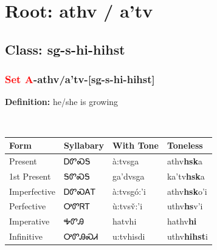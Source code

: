 \needspace{4in}
\section*{Root: athv / a'tv}
\nopagebreak
{}
\needspace{3in}
\subsection*{Class: sg-s-hi-hihst}
\nopagebreak
\needspace{2in}
\subsubsection*{\textcolor{Red}{Set A}{-}\textbf{athv/a'tv}{-}[sg-s-hi-hihst]}
\nopagebreak
\textbf{Definition: } he/she is growing
\\[0.5em]
\begin{tabularx}{\textwidth}{l X X X}%
\toprule%
\textbf{Form}&\textbf{Syllabary}&\textbf{With Tone}&\textbf{Toneless}\\%
\midrule%
Present&ᎠᏛᏍᎦ&à:tvsga&athv\textbf{hsk}a\\%
1st Present&ᎦᏛᏍᎦ&ga’dvsga&ka'tv\textbf{hsk}a\\%
Imperfective&ᎠᏛᏍᎪᎢ&à:tvsgó:’i&athv\textbf{hsk}o'i\\%
Perfective&ᎤᏛᏒᎢ&ù:tvsv̌:’i&uthv\textbf{hs}v'i\\%
Imperative&ᎭᏛᎯ&hatvhi&hathv\textbf{hi}\\%
Infinitive&ᎤᏛᎯᏍᏗ&u:tvhisdi&uthv\textbf{hihst}i\\%
\bottomrule%
\end{tabularx}
\\[1em]